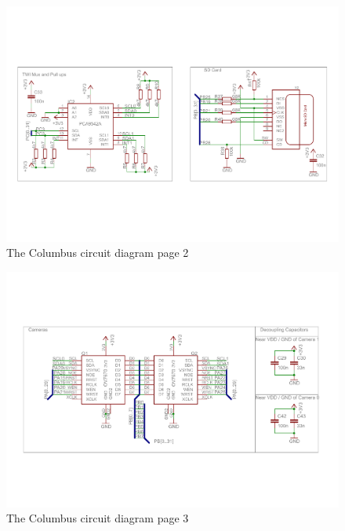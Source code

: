 \begin{figure}[ht!]
\centering
\includegraphics[angle = 90, width=\textwidth,height=\textheight,keepaspectratio]{./Figures/ColumbusCircuitPage2.pdf}
\caption{The Columbus circuit diagram page 2}
\label{sch:Columbus_Schematic:2}
\end{figure}

\begin{figure}[ht!]
\centering
\includegraphics[angle =  90, width=\textwidth,height=\textheight,keepaspectratio]{./Figures/ColumbusCircuitPage3.pdf}
\caption{The Columbus circuit diagram page 3}
\label{sch:Columbus_Schematic:3}
\end{figure}

